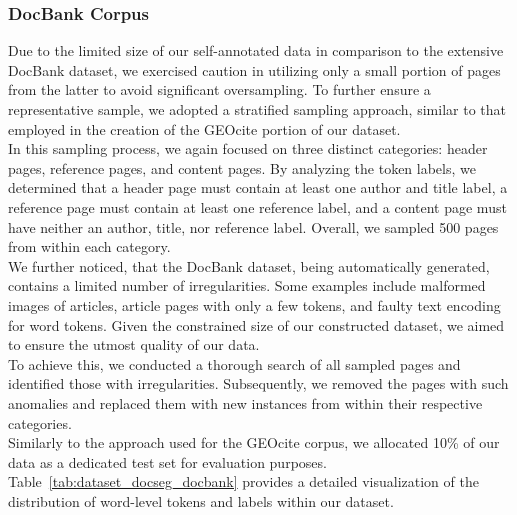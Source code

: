 \subsubsection{DocBank Corpus}

Due to the limited size of our self-annotated data in comparison to the extensive DocBank dataset, we exercised caution in utilizing only a small portion of pages from the latter to avoid significant oversampling. To further ensure a representative sample, we adopted a stratified sampling approach, similar to that employed in the creation of the GEOcite portion of our dataset.\\
In this sampling process, we again focused on three distinct categories: header pages, reference pages, and content pages. By analyzing the token labels, we determined that a header page must contain at least one author and title label, a reference page must contain at least one reference label, and a content page must have neither an author, title, nor reference label. Overall, we sampled 500 pages from within each category.\\
We further noticed, that the DocBank dataset, being automatically generated, contains a limited number of irregularities. Some examples include malformed images of articles, article pages with only a few tokens, and faulty text encoding for word tokens. Given the constrained size of our constructed dataset, we aimed to ensure the utmost quality of our data.\\
To achieve this, we conducted a thorough search of all sampled pages and identified those with irregularities. Subsequently, we removed the pages with such anomalies and replaced them with new instances from within their respective categories.\\
Similarly to the approach used for the GEOcite corpus, we allocated 10\% of our data as a dedicated test set for evaluation purposes. Table~\ref{tab:dataset_docseg_docbank} provides a detailed visualization of the distribution of word-level tokens and labels within our dataset.

